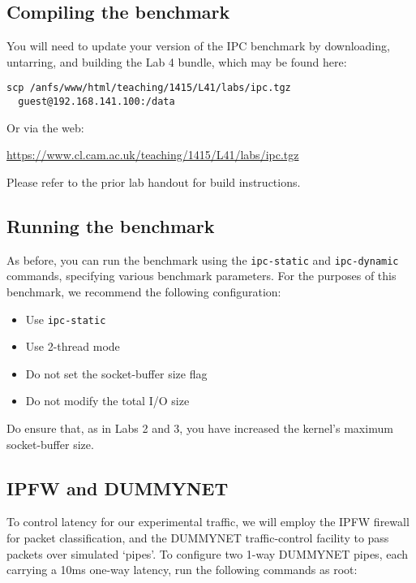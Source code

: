 \documentclass[a4paper,10pt]{article}
\begin{document}
\subsection*{Compiling the benchmark}

You will need to update your version of the IPC benchmark by downloading,
untarring, and building the Lab 4 bundle, which may be found here:

\begin{verbatim}
scp /anfs/www/html/teaching/1415/L41/labs/ipc.tgz
  guest@192.168.141.100:/data
\end{verbatim}

\noindent
Or via the web:

\medskip
\noindent
\url{https://www.cl.cam.ac.uk/teaching/1415/L41/labs/ipc.tgz}
\medskip

\noindent
Please refer to the prior lab handout for build instructions.

\subsection*{Running the benchmark}

As before, you can run the benchmark using the \texttt{ipc-static} and
\texttt{ipc-dynamic} commands, specifying various benchmark parameters.
For the purposes of this benchmark, we recommend the following configuration:

\begin{itemize}
\item Use \texttt{ipc-static}
\item Use 2-thread mode
\item Do not set the socket-buffer size flag
\item Do not modify the total I/O size
\end{itemize}

\noindent
Do ensure that, as in Labs 2 and 3, you have increased the kernel's maximum 
socket-buffer size.

\subsection*{IPFW and DUMMYNET}

To control latency for our experimental traffic, we will employ the IPFW
firewall for packet classification, and the DUMMYNET traffic-control facility
to pass packets over simulated `pipes'.
To configure two 1-way DUMMYNET pipes, each carrying a 10ms one-way latency,
run the following commands as root:
\end{document}
